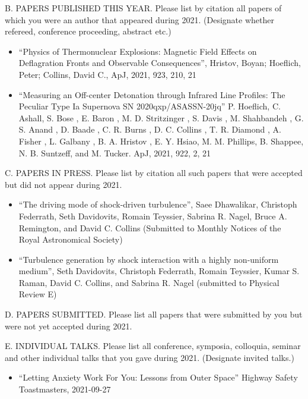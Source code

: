 \noindent B. PAPERS PUBLISHED THIS YEAR. Please list by citation all
papers of which you were an author that appeared during 2021.
(Designate whether refereed, conference proceeding, abstract etc.)
\bigskip

\begin{itemize}
    \item ``Physics of Thermonuclear Explosions: Magnetic Field Effects on
        Deflagration
        Fronts and Observable Consequences'', Hristov, Boyan; Hoeflich, Peter;
        Collins,
        David C., ApJ, 2021, 923, 210, 21
    \item
``Measuring an Off-center Detonation through Infrared Line Profiles: The
Peculiar Type Ia Supernova SN 2020qxp/ASASSN-20jq'' P. Hoeflich, C. Ashall,
S. Bose , E. Baron , M. D. Stritzinger , S. Davis , M. Shahbandeh , G. S.
Anand ,
D. Baade , C. R. Burns , D. C. Collins , T. R. Diamond , A. Fisher , L.
Galbany , B. A. Hristov ,
E. Y. Hsiao, M. M. Phillips, B. Shappee, N. B. Suntzeff, and M.
Tucker.  ApJ, 2021, 922, 2, 21
\end{itemize}


\noindent C. PAPERS IN PRESS. Please list by citation all such
papers that were accepted but did not appear during 2021.
\bigskip

\begin{itemize}
    \item 
        ``The driving mode of shock-driven turbulence'',
        Saee Dhawalikar, Christoph Federrath, Seth Davidovits, Romain
        Teyssier, Sabrina R. Nagel, Bruce A. Remington, and David C. Collins
        (Submitted to Monthly Notices of the Royal Astronomical Society)
    \item
        ``Turbulence generation by shock interaction with a highly non-uniform
        medium'', Seth Davidovits, Christoph Federrath, Romain Teyssier,
        Kumar S. Raman, David C. Collins, and Sabrina R. Nagel  (submitted to
        Physical
        Review E)
\end{itemize}

\noindent D. PAPERS SUBMITTED. Please list all papers that were
submitted by you but were not yet accepted during 2021.
\bigskip


\noindent E. INDIVIDUAL TALKS. Please list all conference, symposia,
colloquia, seminar and other individual talks that you gave during
2021.  (Designate invited talks.)
\bigskip
%
\begin{itemize}
    \item ``Letting Anxiety Work For You: Lessons from Outer Space'' Highway
        Safety Toastmasters, 2021-09-27
\end{itemize}

